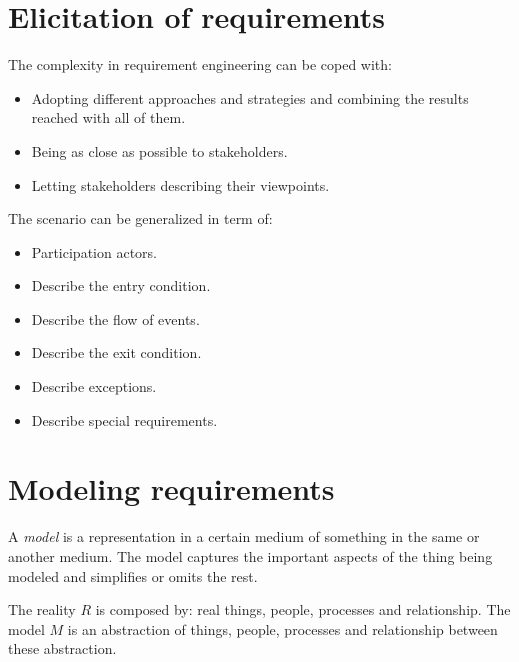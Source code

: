 \documentclass[12pt, a4paper]{report}
\newtheorem[style=M,bodystyle=\normalfont]{theorem}{Theorem}
\newtheorem[style=M,bodystyle=\normalfont]{corollary}{Corollary}
\newtheorem[style=M,bodystyle=\normalfont]{lemma}{Lemma}
\newtheorem[style=M,bodystyle=\normalfont]{definition}{Definition}
\begin{document}
    \section{Elicitation of requirements}
    The complexity in requirement engineering can be coped with:
    \begin{itemize}
        \item Adopting different approaches and strategies and combining the results reached with all of them.
        \item Being as close as possible to stakeholders.
        \item Letting stakeholders describing their viewpoints.
    \end{itemize}
    The scenario can be generalized in term of:
    \begin{itemize}
        \item Participation actors.
        \item Describe the entry condition.
        \item Describe the flow of events.
        \item Describe the exit condition.
        \item Describe exceptions.
        \item Describe special requirements.
    \end{itemize}
\section{Modeling requirements}
    \begin{definition}
        A \emph{model} is a representation in a certain medium of something in the same or another medium. The model captures the important aspects of the thing being modeled and 
        simplifies or omits the rest. 
    \end{definition}
    The reality $R$ is composed by: real things, people, processes and relationship. The model $M$ is an abstraction of things, people, processes and relationship between these 
    abstraction. 
     
\end{document}
